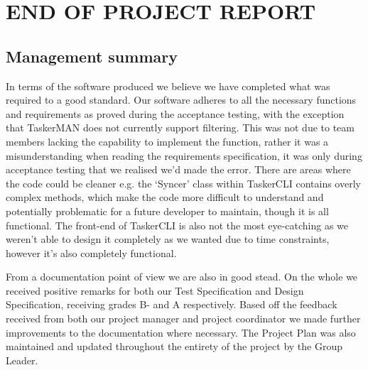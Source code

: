 \documentclass{project}
\begin{document}
\section{END OF PROJECT REPORT}
\subsection{Management summary}
In terms of the software produced we believe we have completed what was required\cite{se.qa.rs} to a good standard. Our software adheres to all the necessary functions and requirements as proved during the acceptance testing, with the exception that TaskerMAN does not currently support filtering. This was not due to team members lacking the capability to implement the function, rather it was a misunderstanding when reading the requirements specification, it was only during acceptance testing that we realised we'd made the error. There are areas where the code could be cleaner e.g. the  `Syncer' class within TaskerCLI contains overly complex methods, which make the code more difficult to understand and potentially problematic for a future developer to maintain, though it is all functional. The front-end of TaskerCLI is also not the most eye-catching as we weren't able to design it completely as we wanted due to time constraints, however it's also completely functional.

From a documentation point of view we are also in good stead. On the whole we received positive remarks for both our Test Specification and Design Specification, receiving grades B- and A respectively. Based off the feedback received from both our project manager and project coordinator we made further improvements to the documentation where necessary. The Project Plan was also maintained and updated throughout the entirety of the project by the Group Leader.
\end{document}
